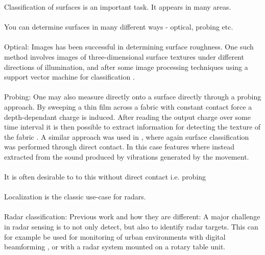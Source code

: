 Classification of surfaces is an important task. It appears in many areas.
\\ \\
You can determine surfaces in many different ways - optical, probing etc.
\\ \\
\noindent Optical: Images has been successful in determining surface roughness. One such method involves images of three-dimensional surface textures under different directions of illumination, and after some image processing techniques using a support vector machine for classification \citep{dong_duan_yang_2008}. 
\\ \\
\noindent Probing: One may also measure directly onto a surface directly through a probing approach. By sweeping a thin film across a fabric with constant contact force a depth-dependant charge is induced. After reading the output charge over some time interval it is then possible to extract information for detecting the texture of the fabric \citep{song_han_hu_li_2014}. A similar approach was used in \citep{strese_schuwerk_iepure_steinbach_2017}, where again surface classification was performed through direct contact. In this case features where instead extracted from the sound produced by vibrations generated by the movement. 
\\ \\
It is often desirable to to this without direct contact i.e. probing
\\ \\
Localization is the classic use-case for radars. 
\\ \\
Radar classification: Previous work and how they are different: A major challenge in radar sensing is to not only detect, but also to identify radar targets. This can for example be used for monitoring of urban environments with digital beamforming \citep{harter_kowalewski_sit_jalilvand_ziroff_zwick_2014}, or with a radar system mounted on a rotary table unit. 

